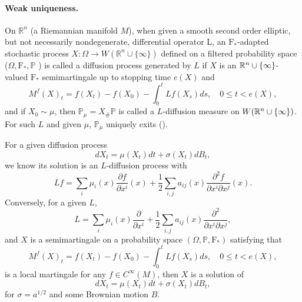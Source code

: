 \paragraph{Weak uniqueness.} On $\mathbb{R}^n$ (a Riemannian manifold $M$), when given a smooth second order elliptic, but not necessarily nondegenerate, diﬀerential operator L, an $\mathrm{F}_*$-adapted stochastic process $X: \Omega \rightarrow W(\mathbb{R}^n \cup \{\infty\})$ defined on a filtered probability space ($\Omega, \mathrm{F}_*, \mathbb{P}$ ) is called a diffusion process generated by $L$ if $X$ is an $\mathbb{R}^n \cup \{\infty\}$-valued $\mathrm{F}_*$ semimartingale up to stopping time $e(X)$ and
$$
M^f(X)_t=f\left(X_t\right)-f\left(X_0\right)-\int_0^t L f\left(X_s\right) d s, \quad 0 \leq t<e(X),
$$
and if $X_0 \sim \mu$, then $\mathbb{P}_\mu = X_{\#}\mathbb{P}$ is called a $L$-diffusion measure on $W(\mathbb{R}^n \cup \{\infty\})$. For such $L$ and given $\mu$, $\mathbb{P}_\mu$ uniquely exits (\cite{hsu2002stochastic}).

For a given diffusion process
\begin{equation*}
    dX_t = \mu(X_t)dt + \sigma(X_t)dB_t,
\end{equation*}
we know its solution is an $L$-diffusion process with
\begin{equation*}
    Lf = \sum_i \mu_i(x) \frac{\partial f}{\partial x^i}(x) + \frac{1}{2}\sum_{i,j}a_{ij}(x)\frac{\partial^2 f}{\partial x^i\partial x^j}(x).
\end{equation*}
Conversely, for a given $L$,
\begin{equation*}
    L = \sum_i \mu_i(x) \frac{\partial}{\partial x^i} + \frac{1}{2}\sum_{i,j}a_{ij}(x)\frac{\partial^2}{\partial x^i\partial x^j},
\end{equation*}
and $X$ is a semimartingale on a probability space $(\Omega,\mathbb{P},\mathrm{F}_*)$ satisfying that  
$$
    M^f(X)_t=f\left(X_t\right)-f\left(X_0\right)-\int_0^t L f\left(X_s\right) d s, \quad 0 \leq t<e(X),
$$
is a local martingale for any $f \in C^\infty(M)$, then $X$ is a solution of 
\begin{equation*}
    dX_t = \mu(X_t)dt + \sigma(X_t)dB_t,
\end{equation*}
for $\sigma = a^{1/2}$ and some Brownian motion $B$.
